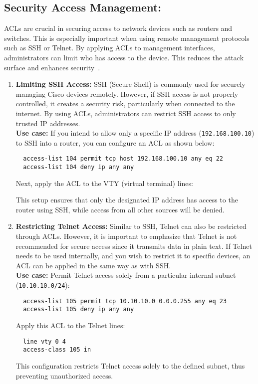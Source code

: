 \documentclass[11pt,a4paper]{article}
\begin{document}
    \subsection*{Security Access Management:}
        ACLs are crucial in securing access to network devices such as routers and switches. This is especially important when using remote management protocols such as SSH or Telnet. By applying ACLs to management interfaces, administrators can limit who has access to the device. This reduces the attack surface and enhances security~\cite{Security-Management}.
            \begin{enumerate}
                \item \textbf{Limiting SSH Access:} SSH (Secure Shell) is commonly used for securely managing Cisco devices remotely. However, if SSH access is not properly controlled, it creates a security risk, particularly when connected to the internet. By using ACLs, administrators can restrict SSH access to only trusted IP addresses.
                \\[1em]
                \textbf{Use case:} If you intend to allow only a specific IP address (\lstinline{192.168.100.10}) to SSH into a router, you can configure an ACL as shown below:
\begin{lstlisting}
  access-list 104 permit tcp host 192.168.100.10 any eq 22
  access-list 104 deny ip any any                  
\end{lstlisting}
                Next, apply the ACL to the VTY (virtual terminal) lines:

                This setup ensures that only the designated IP address has access to the router using SSH, while access from all other sources will be denied.

                \item \textbf{Restricting Telnet Access:} Similar to SSH, Telnet can also be restricted through ACLs. However, it is important to emphasize that Telnet is not recommended for secure access since it transmits data in plain text. If Telnet needs to be used internally, and you wish to restrict it to specific devices, an ACL can be applied in the same way as with SSH.
                \\[1em]
                \textbf{Use case:} Permit Telnet access solely from a particular internal subnet (\lstinline{10.10.10.0/24}):
\begin{lstlisting}
  access-list 105 permit tcp 10.10.10.0 0.0.0.255 any eq 23
  access-list 105 deny ip any any                                                 
\end{lstlisting}
                Apply this ACL to the Telnet lines:
\begin{lstlisting}
  line vty 0 4
  access-class 105 in                                              
\end{lstlisting}
                This configuration restricts Telnet access solely to the defined subnet, thus preventing unauthorized access.

            \end{enumerate}
\end{document}
